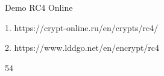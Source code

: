 \documentclass{article}
\begin{document}

Demo RC4 Online

1. https://crypt-online.ru/en/crypts/rc4/ 

2. https://www.lddgo.net/en/encrypt/rc4

54
\end{document}
